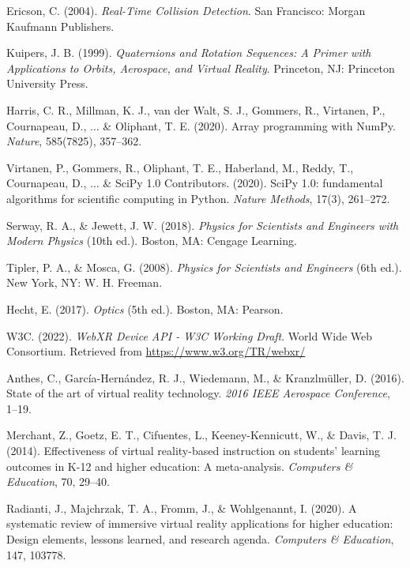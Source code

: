 \begin{enumerate}[label={[\arabic*]}, leftmargin=2.5em, itemsep=6pt]
    \item Ericson, C. (2004). \textit{Real-Time Collision Detection}. San Francisco: Morgan Kaufmann Publishers.
    \item Kuipers, J. B. (1999). \textit{Quaternions and Rotation Sequences: A Primer with Applications to Orbits, Aerospace, and Virtual Reality}. Princeton, NJ: Princeton University Press.
    \item Harris, C. R., Millman, K. J., van der Walt, S. J., Gommers, R., Virtanen, P., Cournapeau, D., ... \& Oliphant, T. E. (2020). Array programming with NumPy. \textit{Nature}, 585(7825), 357--362.
    \item Virtanen, P., Gommers, R., Oliphant, T. E., Haberland, M., Reddy, T., Cournapeau, D., ... \& SciPy 1.0 Contributors. (2020). SciPy 1.0: fundamental algorithms for scientific computing in Python. \textit{Nature Methods}, 17(3), 261--272.
    \item Serway, R. A., \& Jewett, J. W. (2018). \textit{Physics for Scientists and Engineers with Modern Physics} (10th ed.). Boston, MA: Cengage Learning.
    \item Tipler, P. A., \& Mosca, G. (2008). \textit{Physics for Scientists and Engineers} (6th ed.). New York, NY: W. H. Freeman.
    \item Hecht, E. (2017). \textit{Optics} (5th ed.). Boston, MA: Pearson.
    \item W3C. (2022). \textit{WebXR Device API - W3C Working Draft}. World Wide Web Consortium. Retrieved from \url{https://www.w3.org/TR/webxr/}
    \item Anthes, C., García-Hernández, R. J., Wiedemann, M., \& Kranzlmüller, D. (2016). State of the art of virtual reality technology. \textit{2016 IEEE Aerospace Conference}, 1--19.
    \item Merchant, Z., Goetz, E. T., Cifuentes, L., Keeney-Kennicutt, W., \& Davis, T. J. (2014). Effectiveness of virtual reality-based instruction on students' learning outcomes in K-12 and higher education: A meta-analysis. \textit{Computers \& Education}, 70, 29--40.
    \item Radianti, J., Majchrzak, T. A., Fromm, J., \& Wohlgenannt, I. (2020). A systematic review of immersive virtual reality applications for higher education: Design elements, lessons learned, and research agenda. \textit{Computers \& Education}, 147, 103778.
\end{enumerate}
\clearpage

